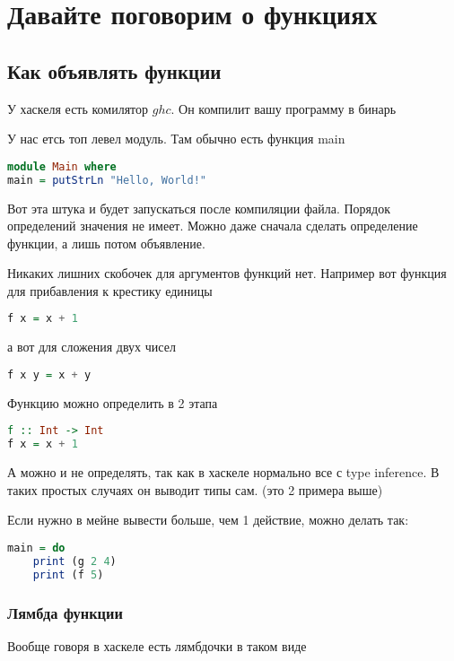 \documentclass[10pt, a4paper]{article}
\begin{document}
\section{Давайте поговорим о функциях}

\subsection{Как объявлять функции}

У хаскеля есть комилятор $ghc$. Он компилит вашу программу в бинарь

У нас етсь топ левел модуль. Там обычно есть функция main

\begin{lstlisting}[language=haskell]
module Main where
main = putStrLn "Hello, World!"
\end{lstlisting}

Вот эта штука и будет запускаться после компиляции файла. Порядок определений значения не имеет. Можно даже сначала сделать определение функции, а лишь потом объявление.

Никаких лишних скобочек для аргументов функций нет. Например вот функция для прибавления к крестику единицы

\begin{lstlisting}[language=haskell]
f x = x + 1
\end{lstlisting}

а вот для сложения двух чисел

\begin{lstlisting}[language=haskell]
f x y = x + y
\end{lstlisting} 

Функцию можно определить в 2 этапа

\begin{lstlisting}[language=haskell]
f :: Int -> Int
f x = x + 1
\end{lstlisting}

А можно и не определять, так как в хаскеле нормально все с type inference. В таких простых случаях он выводит типы сам. (это 2 примера выше)

Если нужно в мейне вывести больше, чем 1 действие, можно делать так:

\begin{lstlisting}[language=haskell]
main = do 
    print (g 2 4)
    print (f 5)
\end{lstlisting}

\subsubsection{Лямбда функции}
Вообще говоря в хаскеле есть лямбдочки в таком виде
\end{document}
